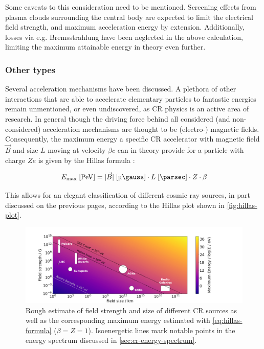 Some caveats to this consideration need to be mentioned. Screening effects from plasma clouds surrounding the central body are expected to limit the electrical 
field strength, and maximum acceleration energy by extension. Additionally, losses via e.g. Bremsstrahlung have been neglected in the above calculation, limiting
the maximum attainable energy in theory even further. 

\subsubsection{Other types}
\label{sssec:cr-hillas-plot}

Several acceleration mechanisms have been discussed. A plethora of other interactions that are able to accelerate elementary particles to fantastic energies remain
unmentioned, or even undiscovered, as CR physics is an active area of research. In general though the driving force behind all considered (and non-considered)
acceleration mechanisms are thought to be (electro-) magnetic fields. Consequently, the maximum energy a specific CR accelerator with magnetic field $\vec{B}$ and 
size $L$ moving at velocity $\beta c$ can in theory provide for a particle with charge $Ze$ is given by the Hillas formula \cite{hillas1984origin}:

\begin{equation}
\label{eq:hillas-formula}
E_\text{max}\;[\SI{}{\peta\electronvolt}] = |\vec{B}|\;[\SI{}{\micro\gauss}] \cdot L\;[\SI{}{\parsec}] \cdot Z \cdot \beta
\end{equation}

This allows for an elegant classification of different cosmic ray sources, in part discussed on the previous pages, according to the Hillas plot shown in 
\autoref{fig:hillas-plot}.

\begin{figure}
	\centering
	\includegraphics[width=1\textwidth]{./plots/hillas_plot.png}
	\caption{Rough estimate of field strength and size of different CR sources as well as the corresponding maximum energy estimated with 
    \autoref{eq:hillas-formula} ($\beta = Z = 1$). Isoenergetic lines mark notable points in the energy spectrum discussed in 
    \autoref{sec:cr-energy-spectrum}.}
	\label{fig:hillas-plot}
\end{figure}

